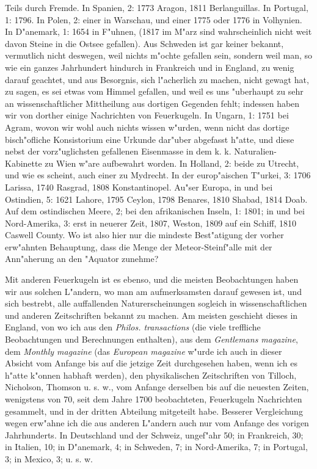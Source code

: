 \documentclass[a4paper, 11pt, oneside, polutonikogreek, german]{article}
\begin{document}
Teils durch Fremde. In Spanien, 2: 1773 Aragon, 1811 Berlanguillas. In Portugal, 1: 1796. In Polen, 2: einer in Warschau, und einer 1775 oder 1776 in Volhynien. In D"anemark, 1: 1654 in F"uhnen, (1817 im M"arz sind wahrscheinlich nicht weit davon Steine in die Ostsee gefallen). Aus Schweden ist gar keiner bekannt, vermutlich nicht deswegen, weil nichts m"ochte gefallen sein, sondern weil man, so wie ein ganzes Jahrhundert hindurch in Frankreich und in England, zu wenig darauf geachtet, und aus Besorgnis, sich l"acherlich zu machen, nicht gewagt hat, zu sagen, es sei etwas vom Himmel gefallen, und weil es uns "uberhaupt zu sehr an wissenschaftlicher Mittheilung aus dortigen Gegenden fehlt; indessen haben wir von dorther einige Nachrichten von Feuerkugeln. In Ungarn, 1: 1751 bei Agram, wovon wir wohl auch nichts wissen w"urden, wenn nicht das dortige bisch"ofliche Konsistorium eine Urkunde dar"uber abgefasst h"atte, und diese nebst der vorz"uglichsten gefallenen Eisenmasse in dem k. k. Naturalien-Kabinette zu Wien w"are aufbewahrt worden. In Holland, 2: beide zu Utrecht, und wie es scheint, auch einer zu Mydrecht. In der europ"aischen T"urkei, 3: 1706 Larissa, 1740 Rasgrad, 1808 Konstantinopel. Au"ser Europa, in und bei Ostindien, 5: 1621 Lahore, 1795 Ceylon, 1798 Benares, 1810 Shabad, 1814 Doab. Auf dem ostindischen Meere, 2; bei den afrikanischen Inseln, 1: 1801; in und bei Nord-Amerika, 3: erst in neuerer Zeit, 1807, Weston, 1809 auf ein Schiff, 1810 Caswell County. Wo ist also hier nur die mindeste Best"atigung der vorher erw"ahnten Behauptung, dass die Menge der Meteor-Steinf"alle mit der Ann"aherung an den "Aquator zunehme?

Mit anderen Feuerkugeln ist es ebenso, und die meisten Beobachtungen haben wir aus solchen L"andern, wo man am aufmerksamsten darauf gewesen ist, und sich bestrebt, alle auffallenden Naturerscheinungen sogleich in wissenschaftlichen und anderen Zeitschriften bekannt zu machen. Am meisten geschieht dieses in England, von wo ich aus den \emph{Philos. transactions} (die viele treffliche Beobachtungen und Berechnungen enthalten), aus dem \emph{Gentlemans magazine}, dem \emph{Monthly magazine} (das \emph{European magazine} w"urde ich auch in dieser Absicht vom Anfange bis auf die jetzige Zeit durchgesehen haben, wenn ich es h"atte k"onnen habhaft werden), den physikalischen Zeitschriften von Tilloch, Nicholson, Thomson u. s. w., vom Anfange derselben bis auf die neuesten Zeiten, wenigstens von 70, seit dem Jahre 1700 beobachteten, Feuerkugeln Nachrichten gesammelt, und in der dritten Abteilung mitgeteilt habe. Besserer Vergleichung wegen erw"ahne ich die aus anderen L"andern auch nur vom Anfange des vorigen Jahrhunderts. In Deutschland und der Schweiz, ungef"ahr 50; in Frankreich, 30; in Italien, 10; in D"anemark, 4; in Schweden, 7; in Nord-Amerika, 7; in Portugal, 3; in Mexico, 3; u. s. w.
\end{document}
